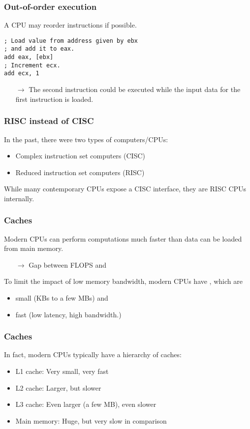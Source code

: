 \documentclass[12pt,t]{beamer}
\let\emph\relax %
\newcommand{\conclude}[1]{%
  \begin{itemize}
    \item[$\rightarrow$]#1
  \end{itemize}
}
\begin{document}
  \begin{frame}[fragile]
    \frametitle{Out-of-order execution}

    A CPU may reorder instructions if possible.

    \begin{lstlisting}[frame=single]
; Load value from address given by ebx
; and add it to eax.
add eax, [ebx]
; Increment ecx.
add ecx, 1
    \end{lstlisting}

    \conclude{The second instruction could be executed while the input data for the first instruction is loaded.}
  \end{frame}

  \begin{frame}[fragile]
    \frametitle{RISC instead of CISC}

    In the past, there were two types of computers/CPUs:
    \begin{itemize}
      \item Complex instruction set computers (CISC)
      \item Reduced instruction set computers (RISC)
    \end{itemize}

    While many contemporary CPUs expose a CISC interface, they are RISC CPUs internally.
  \end{frame}

  \begin{frame}[fragile]
    \frametitle{Caches}

    Modern CPUs can perform computations much faster than data can be loaded from main memory.
    \conclude{Gap between FLOPS and \emph{memory bandwidth}}

    To limit the impact of low memory bandwidth, modern CPUs have \emph{caches}, which are
    \begin{itemize}
      \item small (KBs to a few MBs) and
      \item fast (low latency, high bandwidth.)
    \end{itemize}
  \end{frame}

  \begin{frame}[fragile]
    \frametitle{Caches}

    In fact, modern CPUs typically have a hierarchy of caches:
    \begin{itemize}
      \item L1 cache: Very small, very fast
      \item L2 cache: Larger, but slower
      \item L3 cache: Even larger (a few MB), even slower
      \item Main memory: Huge, but very slow in comparison
    \end{itemize}
  \end{frame}
\end{document}
